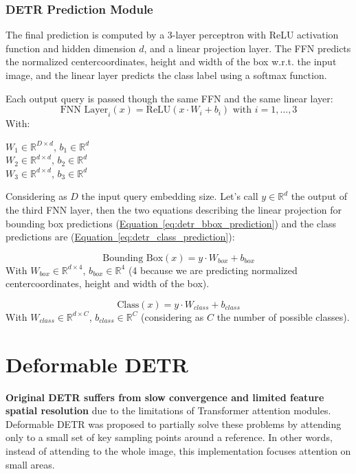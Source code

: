 \documentclass[12pt]{article}
\begin{document}
\subsubsection{DETR Prediction Module}
The final prediction is computed by a 3-layer perceptron with ReLU activation function and hidden dimension $d$, 
and a linear projection layer. The FFN predicts the normalized centercoordinates, height and width of the 
box w.r.t. the input image, and the linear layer predicts the class label using a softmax function.

Each output query is passed though the same FFN and the same linear layer:
\begin{equation}
    \text{FNN Layer}_i(x) = \text{ReLU}(x \cdot W_i + b_i) \text{ with } i=1,\dots,3
\end{equation}
With:
\begin{center}
    $W_1 \in \mathbb{R}^{D \times d}$, $b_1 \in \mathbb{R}^{d}$\\
    $W_2 \in \mathbb{R}^{d \times d}$, $b_2 \in \mathbb{R}^{d}$\\
    $W_3 \in \mathbb{R}^{d \times d}$, $b_3 \in \mathbb{R}^{d}$
\end{center}
Considering as $D$ the input query embedding size.
Let's call $y \in \mathbb{R}^{d}$ the output of the third FNN layer, then the two equations describing 
the linear projection for bounding box predictions 
(\hyperref[eq:detr_bbox_prediction]{Equation~\ref*{eq:detr_bbox_prediction}}) and the class predictions 
are (\hyperref[eq:detr_class_prediction]{Equation~\ref*{eq:detr_class_prediction}}):

\begin{equation}
    \text{Bounding Box} (x) =  y \cdot W_{box} + b_{box}
    \label{eq:detr_bbox_prediction}
\end{equation}
With $W_{box} \in \mathbb{R}^{d \times 4}$, $b_{box} \in \mathbb{R}^4$ (4 because we are predicting
normalized centercoordinates, height and width of the box).

\begin{equation}
    \text{Class} (x) =  y \cdot W_{class} + b_{class}
    \label{eq:detr_class_prediction}
\end{equation}
With $W_{class} \in \mathbb{R}^{d \times C}$, $b_{class} \in \mathbb{R}^C$ (considering as $C$ the number of 
possible classes).




\section{Deformable DETR}
\textbf{Original DETR suffers from slow convergence and limited feature spatial resolution} due to the limitations 
of Transformer attention modules. Deformable DETR was proposed to partially solve these problems by attending 
only to a small set of key sampling points around a reference. In other words, instead of attending to the 
whole image, this implementation focuses attention on small areas. 
\end{document}
